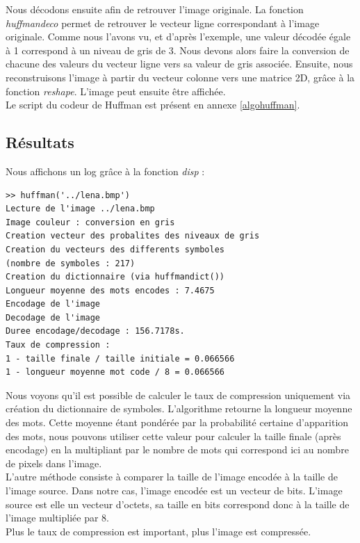 \documentclass[a4paper, 12pt]{article}
\begin{document}
Nous décodons ensuite afin de retrouver l'image originale. La fonction \textit{huffmandeco} permet de retrouver le vecteur ligne correspondant à l'image originale. Comme nous l'avons vu, et d'après l'exemple, une valeur décodée égale à 1 correspond à un niveau de gris de 3. Nous devons alors faire la conversion de chacune des valeurs du vecteur ligne vers sa valeur de gris associée. Ensuite, nous reconstruisons l'image à partir du vecteur colonne vers une matrice 2D, grâce à la fonction \textit{reshape}. L'image peut ensuite être affichée.\\

Le script du codeur de Huffman est présent en annexe \ref{algohuffman}.


\subsection{Résultats}

Nous affichons un log grâce à la fonction \textit{disp} :

\begin{verbatim}
>> huffman('../lena.bmp')
Lecture de l'image ../lena.bmp
Image couleur : conversion en gris
Creation vecteur des probalites des niveaux de gris
Creation du vecteurs des differents symboles
(nombre de symboles : 217)
Creation du dictionnaire (via huffmandict())
Longueur moyenne des mots encodes : 7.4675
Encodage de l'image
Decodage de l'image
Duree encodage/decodage : 156.7178s.
Taux de compression : 
1 - taille finale / taille initiale = 0.066566
1 - longueur moyenne mot code / 8 = 0.066566
\end{verbatim}

Nous voyons qu'il est possible de calculer le taux de compression uniquement via création du dictionnaire de symboles. L'algorithme retourne la longueur moyenne des mots. Cette moyenne étant pondérée par la probabilité certaine d'apparition des mots, nous pouvons utiliser cette valeur pour calculer la taille finale (après encodage) en la multipliant par le nombre de mots qui correspond ici au nombre de pixels dans l'image.\\

L'autre méthode consiste à comparer la taille de l'image encodée à la taille de l'image source. Dans notre cas, l'image encodée est un vecteur de bits. L'image source est elle un vecteur d'octets, sa taille en bits correspond donc à la taille de l'image multipliée par 8.\\

Plus le taux de compression est important, plus l'image est compressée. \\
\end{document}
